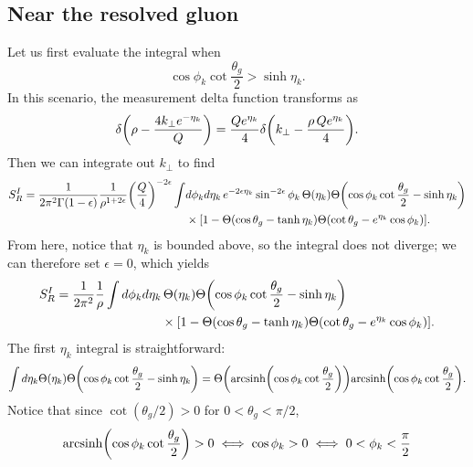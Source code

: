 \documentclass[11pt,twoside,reqno]{amsart}
\theoremstyle{plain}
\theoremstyle{remark}
\theoremstyle{definition}
\theoremstyle{remark}
\theoremstyle{definition}
\theoremstyle{definition}
\newcommand{\arcsinh}{\mathrm{arcsinh}}
\begin{document}
\subsection{Near the resolved gluon}
	Let us first evaluate the integral when
	\begin{equation}
		\cos\phi_k \cot\frac{\theta_g}{2} > \sinh\eta_k.
	\end{equation}
	In this scenario, the measurement delta function transforms as
	\begin{equation}
		\delta\qty(\rho - \frac{4k_\perp e^{-\eta_k}}{Q}) = \frac{Q e^{\eta_k}}{4}\delta\qty(k_\perp - \frac{\rho\,Q e^{\eta_k}}{4}).
	\end{equation}
	Then we can integrate out $k_\perp$ to find
	\begin{equation}
	\begin{aligned}
		S_R^I = \frac{1}{2\pi^2\Gamma(1-\epsilon)} \frac{1}{\rho^{1+2\epsilon}} \qty(\frac{Q}{4})^{-2\epsilon} \int& d\phi_k d\eta_k \,e^{-2\epsilon\eta_k} \sin^{-2\epsilon}\phi_k\,\Theta(\eta_k) \Theta\qty(\cos\phi_k\cot\frac{\theta_g}{2} - \sinh\eta_k) \\
		&\times \qty[1 - \Theta(\cos\theta_g - \tanh\eta_k)\Theta(\cot\theta_g - e^{\eta_k}\cos\phi_k)].
	\end{aligned}
	\end{equation}
	From here, notice that $\eta_k$ is bounded above, so the integral does not diverge; we can therefore set $\epsilon = 0$, which yields
	\begin{equation}\label{eq:gluon integral setup}
	\begin{aligned}
		S^I_R = \frac{1}{2\pi^2}\frac{1}{\rho} \int d\phi_k d\eta_k&\,\Theta(\eta_k)\Theta\qty(\cos\phi_k \cot\frac{\theta_g}{2} - \sinh\eta_k) \\
		&\times \qty[1 - \Theta(\cos\theta_g - \tanh\eta_k)\Theta(\cot\theta_g - e^{\eta_k}\cos\phi_k)].
	\end{aligned}
	\end{equation}
	The first $\eta_k$ integral is straightforward:
	\begin{equation}
		\int d\eta_k \Theta(\eta_k)\Theta\qty(\cos\phi_k \cot\frac{\theta_g}{2} - \sinh\eta_k) = \Theta\qty(\arcsinh\qty(\cos\phi_k \cot\frac{\theta_g}{2}))\arcsinh\qty(\cos\phi_k \cot\frac{\theta_g}{2}).
	\end{equation}
	Notice that since $\cot(\theta_g/2) > 0$ for $0 < \theta_g < \pi/2$,
	\begin{equation}
		\arcsinh\qty(\cos\phi_k \cot\frac{\theta_g}{2}) > 0 \iff \cos\phi_k > 0 \iff 0 < \phi_k < \frac{\pi}{2}
	\end{equation}
\end{document}
